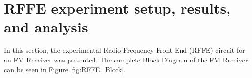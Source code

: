 








\section{RFFE experiment setup, results, and analysis}

In this section, the experimental Radio-Frequency Front End (RFFE) circuit for an FM Receiver was presented. The complete Block Diagram of the FM Receiver can be seen in Figure \ref{fig:RFFE_Block}.

